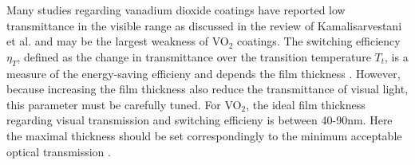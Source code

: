 %
Many studies regarding vanadium dioxide coatings have reported low transmittance in the visible range
as discussed in the review of Kamalisarvestani et al. \cite[p.358]{Kamalisarvestani2013} and 
may be the largest weakness of VO$_2$ coatings. The switching efficiency $\eta_T$,
defined as the change in transmittance over the transition temperature $T_t$, is a measure
of the energy-saving efficieny and depends the film thickness \cite[p.~4569]{Blackman2009}.
However, because increasing the film thickness also reduce the transmittance of visual light,
this parameter must be carefully tuned.
%
For VO$_2$, the ideal film thickness regarding visual transmission
and switching efficieny is between 40-90nm. Here the maximal
thickness should be set correspondingly to the minimum acceptable optical transmission
\cite[p.~358]{Kamalisarvestani2013} 
\cite[p.~4569]{Blackman2009}.

